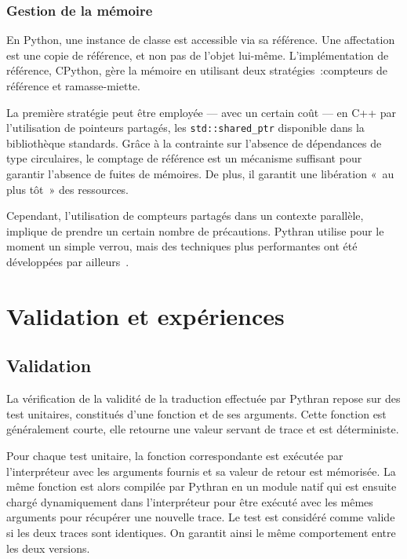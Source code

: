 \documentclass[renpar]{compas2013}
\begin{document}
\subsubsection{Gestion de la mémoire}

En Python, une instance de classe est accessible via sa référence. Une
affectation est une copie de référence, et non pas de l'objet lui-même.
L'implémentation de référence, CPython, gère la mémoire en utilisant deux
stratégies~:compteurs de référence et ramasse-miette.

La première stratégie peut être employée --- avec un certain coût --- en
C++ par l'utilisation de pointeurs partagés, les \texttt{std::shared\_ptr}
disponible dans la bibliothèque standards.  Grâce à la contrainte sur
l'absence de dépendances de type circulaires, le comptage de référence est
un mécanisme suffisant pour garantir l'absence de fuites de mémoires. De
plus, il garantit une libération «~au plus tôt~» des ressources.

Cependant, l'utilisation de compteurs partagés dans un contexte parallèle,
implique de prendre un certain nombre de précautions. Pythran utilise pour
le moment un simple verrou, mais des techniques plus performantes ont été
développées par ailleurs~\cite{Levanoni2006}.

\section{Validation et expériences}\label{sec:validation}

\subsection{Validation}

La vérification de la validité de la traduction effectuée par Pythran
repose sur des test unitaires, constitués d'une fonction et de ses
arguments.  Cette fonction est généralement courte, elle retourne une
valeur servant de trace et est déterministe.

Pour chaque test unitaire, la fonction correspondante est exécutée par
l'interpréteur avec les arguments fournis et sa valeur de retour est
mémorisée. La même fonction est alors compilée par Pythran en un module
natif qui est ensuite chargé dynamiquement dans l'interpréteur pour être
exécuté avec les mêmes arguments pour récupérer une nouvelle trace. Le
test est considéré comme valide si les deux traces sont identiques. On
garantit ainsi le même comportement entre les deux versions.
\end{document}
